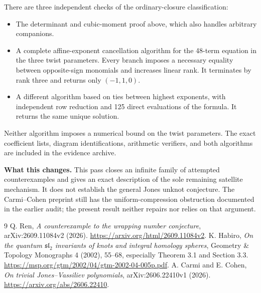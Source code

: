 \documentclass[11pt]{article}
\begin{document}
There are three independent checks of the ordinary-closure classification:
\begin{itemize}
\item The determinant and cubic-moment proof above, which also handles arbitrary companions.
\item A complete affine-exponent cancellation algorithm for the 48-term equation in the three twist parameters. Every branch imposes a necessary equality between opposite-sign monomials and increases linear rank. It terminates by rank three and returns only $(-1,1,0)$.
\item A different algorithm based on ties between highest exponents, with independent row reduction and 125 direct evaluations of the formula. It returns the same unique solution.
\end{itemize}
Neither algorithm imposes a numerical bound on the twist parameters. The exact coefficient lists, diagram identifications, arithmetic verifiers, and both algorithms are included in the evidence archive.

\textbf{What this changes.}
This pass closes an infinite family of attempted counterexamples and gives an exact description of the sole remaining satellite mechanism. It does not establish the general Jones unknot conjecture. The Carmi--Cohen preprint \cite{CC} still has the uniform-compression obstruction documented in the earlier audit; the present result neither repairs nor relies on that argument.

\begin{thebibliography}{9}
 Q. Ren, \emph{A counterexample to the wrapping number conjecture},
arXiv:2609.11084v2 (2026).
\url{https://arxiv.org/html/2609.11084v2}.
 K. Habiro, \emph{On the quantum $\mathfrak{sl}_2$ invariants of knots and integral homology spheres},
Geometry \& Topology Monographs 4 (2002), 55--68, especially Theorem 3.1 and Section 3.3.
\url{https://msp.org/gtm/2002/04/gtm-2002-04-005p.pdf}.
 A. Carmi and E. Cohen, \emph{On trivial Jones--Vassiliev polynomials},
arXiv:2606.22410v1 (2026).
\url{https://arxiv.org/abs/2606.22410}.
\end{thebibliography}
\end{document}
